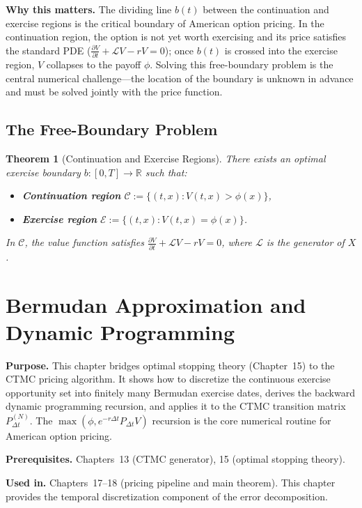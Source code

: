 \documentclass[11pt,a4paper,openany]{book}
\theoremstyle{definition}
\theoremstyle{plain}
\newtheorem{theorem}{Theorem}[chapter]
\theoremstyle{remark}
\newcommand{\1}{\mathbbm{1}}
\newcommand{\R}{\mathbb{R}}
\newcommand{\calL}{\mathcal{L}}
\newcommand{\calE}{\mathcal{E}}
\newcommand{\calC}{\mathcal{C}}
\begin{document}
\medskip
\noindent\textbf{Why this matters.} The dividing line $b(t)$ between the continuation and exercise regions is the critical boundary of American option pricing. In the continuation region, the option is not yet worth exercising and its price satisfies the standard PDE ($\frac{\partial V}{\partial t} + \mathcal{L}V - rV = 0$); once $b(t)$ is crossed into the exercise region, $V$ collapses to the payoff $\phi$. Solving this free-boundary problem is the central numerical challenge---the location of the boundary is unknown in advance and must be solved jointly with the price function.

\section{The Free-Boundary Problem}

\begin{theorem}[Continuation and Exercise Regions]
There exists an optimal exercise boundary $b: [0,T] \to \R$ such that:
\begin{itemize}
    \item \textbf{Continuation region} $\calC := \{(t,x) : V(t,x) > \phi(x)\}$,
    \item \textbf{Exercise region} $\calE := \{(t,x) : V(t,x) = \phi(x)\}$.
\end{itemize}
In $\calC$, the value function satisfies $\frac{\partial V}{\partial t} + \calL V - rV = 0$, where $\calL$ is the generator of $X$.
\end{theorem}

\chapter{Bermudan Approximation and Dynamic Programming}

\noindent\textbf{Purpose.} This chapter bridges optimal stopping theory (Chapter~15) to the CTMC pricing algorithm. It shows how to discretize the continuous exercise opportunity set into finitely many Bermudan exercise dates, derives the backward dynamic programming recursion, and applies it to the CTMC transition matrix $P_{\Delta t}^{(N)}$. The $\max(\phi, e^{-r\Delta t} P_{\Delta t} V)$ recursion is the core numerical routine for American option pricing.

\textbf{Prerequisites.} Chapters~13 (CTMC generator), 15 (optimal stopping theory).

\textbf{Used in.} Chapters~17--18 (pricing pipeline and main theorem). This chapter provides the temporal discretization component of the error decomposition.
\end{document}
